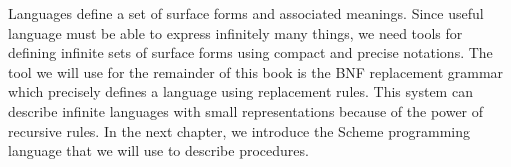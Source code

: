 Languages define a set of surface forms and associated meanings.  Since useful language must be able to express infinitely many things, we need tools for defining infinite sets of surface forms using compact and precise notations.  The tool we will use for the remainder of this book is the BNF replacement grammar which precisely defines a language using replacement rules.  This system can describe infinite languages with small representations because of the power of recursive rules.  In the next chapter, we introduce the Scheme programming language that we will use to describe procedures. 

